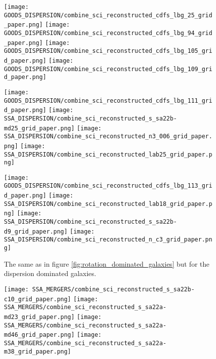 \documentclass[fleqn,usenatbib]{mn2e}
\begin{document}
\begin{figure*}\ContinuedFloat
\centering

    \texttt{[image: GOODS\_DISPERSION/combine\_sci\_reconstructed\_cdfs\_lbg\_25\_grid\_paper.png]}
    \texttt{[image: GOODS\_DISPERSION/combine\_sci\_reconstructed\_cdfs\_lbg\_94\_grid\_paper.png]}
    \texttt{[image: GOODS\_DISPERSION/combine\_sci\_reconstructed\_cdfs\_lbg\_105\_grid\_paper.png]}
    \texttt{[image: GOODS\_DISPERSION/combine\_sci\_reconstructed\_cdfs\_lbg\_109\_grid\_paper.png]}


\end{figure*}


\begin{figure*}\ContinuedFloat
    \centering

    \texttt{[image: GOODS\_DISPERSION/combine\_sci\_reconstructed\_cdfs\_lbg\_111\_grid\_paper.png]}
    \texttt{[image: SSA\_DISPERSION/combine\_sci\_reconstructed\_s\_sa22b-md25\_grid\_paper.png]}
    \texttt{[image: SSA\_DISPERSION/combine\_sci\_reconstructed\_n3\_006\_grid\_paper.png]}
    \texttt{[image: SSA\_DISPERSION/combine\_sci\_reconstructed\_lab25\_grid\_paper.png]}


\end{figure*}

\begin{figure*}\ContinuedFloat
    \centering

    \texttt{[image: GOODS\_DISPERSION/combine\_sci\_reconstructed\_cdfs\_lbg\_113\_grid\_paper.png]}
    \texttt{[image: SSA\_DISPERSION/combine\_sci\_reconstructed\_lab18\_grid\_paper.png]}
    \texttt{[image: SSA\_DISPERSION/combine\_sci\_reconstructed\_s\_sa22b-d9\_grid\_paper.png]}
    \texttt{[image: SSA\_DISPERSION/combine\_sci\_reconstructed\_n\_c3\_grid\_paper.png]}

    \caption{The same as in figure \protect\ref{fig:rotation_dominated_galaxies} but for the dispersion dominated galaxies.}
    \label{fig:dispersion_dominated_galaxies}

\end{figure*}


\begin{figure*}\ContinuedFloat
    \centering

    \texttt{[image: SSA\_MERGERS/combine\_sci\_reconstructed\_s\_sa22b-c10\_grid\_paper.png]}
    \texttt{[image: SSA\_MERGERS/combine\_sci\_reconstructed\_s\_sa22a-md23\_grid\_paper.png]}
    \texttt{[image: SSA\_MERGERS/combine\_sci\_reconstructed\_s\_sa22a-md46\_grid\_paper.png]}
    \texttt{[image: SSA\_MERGERS/combine\_sci\_reconstructed\_s\_sa22a-m38\_grid\_paper.png]}    


\end{figure*}
\end{document}
